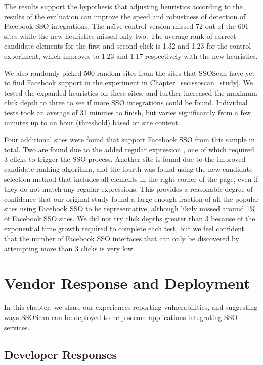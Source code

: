 The results support the hypothesis that adjusting heu\-ri\-stics according to the results of the evaluation can improve the speed and robustness of detection of Facebook SSO integrations.  The na\"{\i}ve control version missed 72 out of the 601 sites while the new heuristics missed only two.  The average rank of correct candidate elements for the first and second click is 1.32 and 1.23 for the control experiment, which improves to 1.23 and 1.17 respectively with the new heuristics.

We also randomly picked 500 random sites from the sites that SSOScan have yet to find Facebook support in the experiment in Chapter~\ref{sec:ssoscan_study}.  We tested the expanded heuristics on these sites, and further increased the maximum click depth to three to see if more SSO integrations could be found.  Individual tests took an average of 31 minutes to finish, but varies significantly from a few minutes up to an hour (threshold) based on site content.

Four additional sites were found that support Facebook SSO from this sample in total.  Two are found due to the added regular expression \code{[Ff][Oo][Rr][Uu][Mm]}, one of which required 3 clicks to trigger the SSO process.  Another site is found due to the improved candidate ranking algorithm, and the fourth was found using the new candidate selection method that includes all elements in the right corner of the page, even if they do not match any regular expressions.  This provides a reasonable degree of confidence that our original study found a large enough fraction of all the popular sites using Facebook SSO to be representative, although likely missed around 1\% of Facebook SSO sites.  We did not try click depths greater than 3 because of the exponential time growth required to complete each test, but we feel confident that the number of Facebook SSO interfaces that can only be discovered by attempting more than 3 clicks is very low.

\section{Vendor Response and Deployment}
\label{sec:ssoscan_deployment}

In this chapter, we share our experiences reporting vulnerabilities, and suggesting ways SSOScan can be deployed to help secure applications integrating SSO services.

\subsection{Developer Responses}
\label{sec:ssoscan_deployment_developerResponses}

